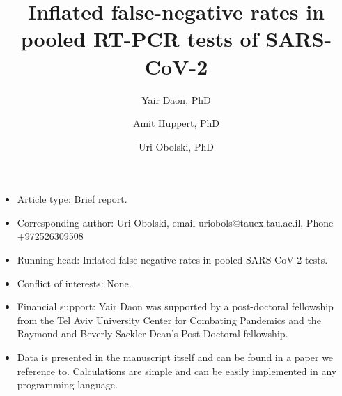 \documentclass{article}
\begin{document}
\title{Inflated false-negative rates in pooled RT-PCR tests of SARS-CoV-2}


\author[1,2]{Yair Daon, PhD}
\author[2,3]{Amit Huppert, PhD}
\author[1,2]{Uri Obolski, PhD}

\date{}

\maketitle
\bigskip
\bigskip
\bigskip
\bigskip
\begin{itemize}
    \item Article type: Brief report.
    \item Corresponding author: Uri Obolski, email uriobols@tauex.tau.ac.il, Phone +972526309508
    \item Running head: Inflated false-negative rates in pooled SARS-CoV-2 tests.
    \item Conflict of interests: None.
    \item Financial support: Yair Daon was supported by a
    post-doctoral fellowship from the Tel Aviv University Center for
    Combating Pandemics and the Raymond and Beverly Sackler Dean's
    Post-Doctoral fellowship.
    \item Data is presented in the manuscript itself and can be found in a paper we reference to. Calculations are simple and can be easily implemented in any programming language.
\end{itemize}
\newpage
\end{document}

